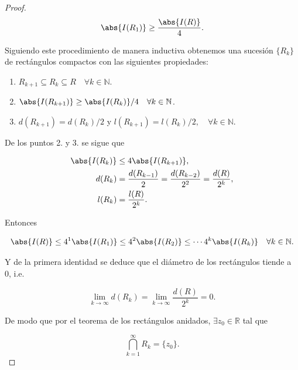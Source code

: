 \documentclass[../main.tex]{subfiles}
\begin{document}
\begin{proof}
    \begin{equation*}
        \abs{I(R_{1})} \geq \dfrac{\abs{I(R)}}{4}.
    \end{equation*}

    Siguiendo este procedimiento de manera inductiva obtenemos una sucesión
    \(\{R_{k}\}\) de
    rectángulos compactos con las siguientes propiedades:

    \begin{enumerate}[label = \arabic*.]
        \item \(R_{k + 1} \subseteq R_{k} \subseteq R\quad \forall k\in \mathbb{N}\).
        \item \(\abs{I(R_{k + 1})} \geq \abs{I(R_{k})}/4\quad \forall k\in
            \mathbb{N}\).
        \item  \(d(R_{k + 1}) = d(R_{k})/2\) y \(l(R_{k + 1}) = l(R_{k})/2,\quad
            \forall k\in \mathbb{N}\).
    \end{enumerate}

    De los puntos 2. y 3. se sigue que

    \begin{align*}
        \abs{I(R_{k})} &\leq 4 \abs{I(R_{k + 1})},\\
        d(R_{k}) &= \dfrac{d(R_{k - 1})}{2} = \dfrac{d(R_{k - 2})}{2^{2}} =
        \dfrac{d(R)}{2^{k}},\\
        l(R_{k}) &= \dfrac{l(R)}{2^{k}}.
    \end{align*}

    Entonces

    \begin{equation*}
        \abs{I(R)} \leq 4^{1}\abs{I(R_{1})} \leq 4^{2}\abs{I(R_{2})} \leq \cdots
        4^{k}\abs{I(R_{k})}\quad \forall k\in \mathbb{N}.
    \end{equation*}

    Y de la primera identidad se deduce que el diámetro de los rectángulos
    tiende a 0, i.e.

    \begin{equation*}
        \lim_{k\to \infty}d(R_{k}) = \lim_{k\to \infty}\dfrac{d(R)}{2^{k}} = 0.
    \end{equation*}

    De modo que por el teorema de los rectángulos anidados, \(\exists
    z_{0}\in \mathbb{R}\)
    tal que

    \begin{equation*}
        \bigcap_{k = 1}^{\infty} R_{k} = \{z_{0}\}.
    \end{equation*}


\end{proof}
\end{document}
